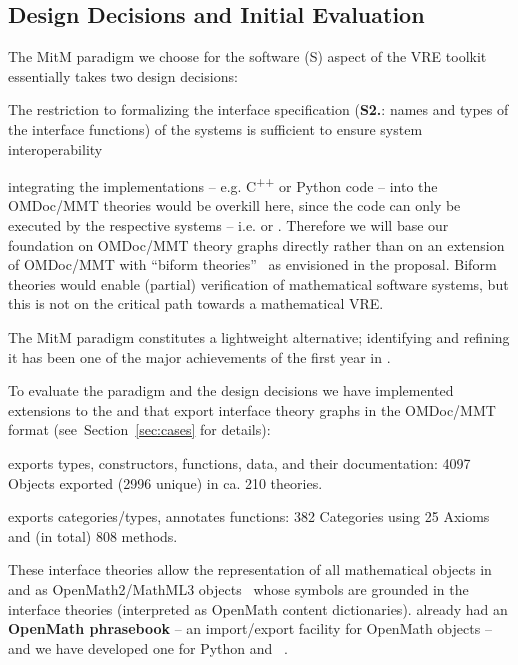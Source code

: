 \subsection{Design Decisions and Initial Evaluation}
The MitM paradigm we choose for the software (S) aspect of the \pn VRE toolkit essentially
takes two design decisions:
\begin{compactenum}[\bf D1.]
\item The restriction to formalizing the interface specification (\textbf{S2.}: names and
  types of the interface functions) of the systems is sufficient to ensure system
  interoperability
\item integrating the implementations -- e.g. C\textsuperscript{++} or Python code -- into
  the OMDoc/MMT theories would be overkill here, since the code can only be executed by
  the respective systems -- i.e. \GAP or \SageMath. Therefore we will base our foundation
  on OMDoc/MMT theory graphs directly rather than on an extension of OMDoc/MMT with
  ``biform theories''~\cite{KohManRab:aumftg13,Farmer:btc07} as envisioned in the
  proposal. Biform theories would enable (partial) verification of mathematical software
  systems, but this is not on the critical path towards a mathematical VRE.
\end{compactenum}
The MitM paradigm constitutes a lightweight alternative; identifying and refining it has
been one of the major achievements of the first year in .

To evaluate the paradigm and the design decisions we have implemented extensions to the
\GAP and \SageMath that export interface theory graphs in the OMDoc/MMT format
(see~Section~\ref{sec:cases} for details):
\begin{compactitem}
\item \GAP exports types, constructors, functions, data, and their documentation: 4097
  Objects exported (2996 unique) in ca. 210 theories.
\item \SageMath exports categories/types, annotates functions: 382 Categories using 25
  Axioms and (in total) 808 methods.
\end{compactitem}
These interface theories allow the representation of all mathematical objects in \GAP and
\SageMath as OpenMath2/MathML3 objects~\cite{BusCapCar:2oms03,CarlisleEd:MathML3} whose
symbols are grounded in the interface theories (interpreted as OpenMath content
dictionaries). \GAP already had an \textbf{OpenMath phrasebook} -- an import/export
facility for OpenMath objects -- and we have developed one for Python and
\SageMath~\cite{py-openmath:on}.

